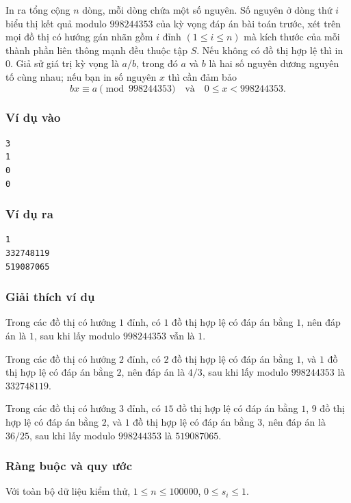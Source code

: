 \documentclass[11pt]{article}
\begin{document}
In ra tổng cộng \(n\) dòng, mỗi dòng chứa một số nguyên. Số nguyên ở dòng thứ
\(i\) biểu thị kết quả modulo \(998244353\) của kỳ vọng đáp án bài toán trước,
xét trên mọi đồ thị có hướng gán nhãn gồm \(i\) đỉnh \((1\le i\le n)\) mà kích
thước của mỗi thành phần liên thông mạnh đều thuộc tập \(S\). Nếu không có đồ
thị hợp lệ thì in \(0\). Giả sử giá trị kỳ vọng là \(a/b\), trong đó \(a\) và
\(b\) là hai số nguyên dương nguyên tố cùng nhau; nếu bạn in số nguyên \(x\)
thì cần đảm bảo
\[
  bx\equiv a\pmod{998244353}
  \quad\text{và}\quad 0\le x<998244353.
\]

\subsubsection{Ví dụ vào}

\begin{verbatim}
3
1
0
0
\end{verbatim}

\subsubsection{Ví dụ ra}

\begin{verbatim}
1
332748119
519087065
\end{verbatim}

\subsubsection{Giải thích ví dụ}

Trong các đồ thị có hướng \(1\) đỉnh, có \(1\) đồ thị hợp lệ có đáp án bằng
\(1\), nên đáp án là \(1\), sau khi lấy modulo \(998244353\) vẫn là \(1\).

Trong các đồ thị có hướng \(2\) đỉnh, có \(2\) đồ thị hợp lệ có đáp án bằng
\(1\), và \(1\) đồ thị hợp lệ có đáp án bằng \(2\), nên đáp án là \(4/3\),
sau khi lấy modulo \(998244353\) là \(332748119\).

Trong các đồ thị có hướng \(3\) đỉnh, có \(15\) đồ thị hợp lệ có đáp án bằng
\(1\), \(9\) đồ thị hợp lệ có đáp án bằng \(2\), và \(1\) đồ thị hợp lệ có đáp
án bằng \(3\), nên đáp án là \(36/25\), sau khi lấy modulo \(998244353\) là
\(519087065\).

\subsubsection{Ràng buộc và quy ước}

Với toàn bộ dữ liệu kiểm thử, \(1\le n\le 100000\), \(0\le s_i\le 1\).
\end{document}
